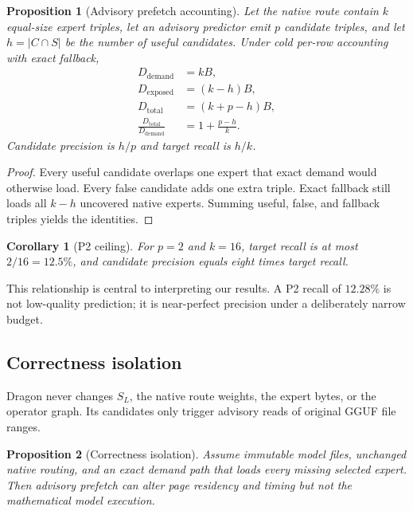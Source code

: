 \documentclass[11pt]{article}
\newtheorem{proposition}{Proposition}
\newtheorem{corollary}{Corollary}
\begin{document}
\begin{proposition}[Advisory prefetch accounting]
\label{prop:accounting}
Let the native route contain $k$ equal-size expert triples, let an advisory predictor emit $p$ candidate triples, and let $h=|C\cap S|$ be the number of useful candidates. Under cold per-row accounting with exact fallback,
\begin{align}
D_{\mathrm{demand}} &= kB,\\
D_{\mathrm{exposed}} &= (k-h)B,\\
D_{\mathrm{total}} &= (k+p-h)B,\\
\frac{D_{\mathrm{total}}}{D_{\mathrm{demand}}} &= 1+\frac{p-h}{k}.
\end{align}
Candidate precision is $h/p$ and target recall is $h/k$.
\end{proposition}

\begin{proof}
Every useful candidate overlaps one expert that exact demand would otherwise load. Every false candidate adds one extra triple. Exact fallback still loads all $k-h$ uncovered native experts. Summing useful, false, and fallback triples yields the identities.
\end{proof}

\begin{corollary}[P2 ceiling]
For $p=2$ and $k=16$, target recall is at most $2/16=12.5\%$, and candidate precision equals eight times target recall.
\end{corollary}

This relationship is central to interpreting our results. A P2 recall of $12.28\%$ is not low-quality prediction; it is near-perfect precision under a deliberately narrow budget.

\subsection{Correctness isolation}

Dragon never changes $S_L$, the native route weights, the expert bytes, or the operator graph. Its candidates only trigger advisory reads of original GGUF file ranges.

\begin{proposition}[Correctness isolation]
Assume immutable model files, unchanged native routing, and an exact demand path that loads every missing selected expert. Then advisory prefetch can alter page residency and timing but not the mathematical model execution.
\end{proposition}
\end{document}
